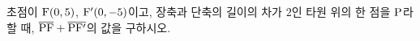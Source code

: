 초점이 $\mathrm{F}(0{,}\mkern3mu\mathopen{}5)$, $\mathrm{F}'(0{,}\mkern3mu\mathopen{}-5)$이고, 장축과 단축의 길이의 차가 $2$인 타원 위의 한 점을 $\mathrm{P}$라 할 때, $\overline{\mathrm{PF}}+\overline{\mathrm{PF'}}$의 값을 구하시오.

